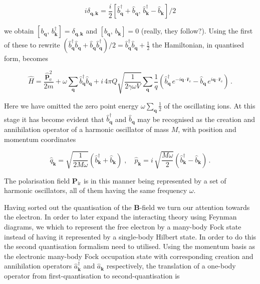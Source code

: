 \documentclass[12pt]{report}
\renewcommand{\vec}[1]{\boldsymbol{\mathbf{#1}}}                        %
\newcommand{\question}[1]{\textcolor{question}{#1}}
\begin{document}
\begin{equation}
	i \delta_{\vec q, \vec k}
	= \frac{i}{2} [\hat b^\dagger_{\vec q} + \hat b_{\vec q}, \, \hat b^\dagger_{\vec k} - \hat b_{\vec k}]/2
\end{equation}

we obtain $ [b_{\vec q}, \, b^\dagger_{\vec k}] = \delta_{\vec q, \vec k} $ and $ [b_{\vec q}, \, b_{\vec k}] = 0 $  \question{(really, they follow?)}. Using the first of these to rewrite $ (\hat b^\dagger_{\vec q} \hat b_{\vec q} + \hat b_{\vec q} \hat b^\dagger_{\vec q})/2  = \hat b^\dagger_{\vec q} \hat b_{\vec q} + \tfrac{1}{2} $ the Hamiltonian, in quantised form, becomes

\begin{equation}
	\hat H = \frac{\hat{\vec p}_\text{e}^2}{2m}
	+ \omega \sum_{\vec q} \hat b^\dagger_{\vec q} \hat b_{\vec q}
	+ i \, 4 \pi Q \sqrt{\frac{1}{2 \gamma \omega V}} \sum_{\vec q} \frac{1}{q} \left( \hat b^\dagger_{\vec q} \, e^{-i \vec q \cdot \hat{\vec r}_\text{e}} - \hat b_{\vec q} \, e^{i \vec q \cdot \hat{\vec r}_\text{e}} \right) \,.
\end{equation}

Here we have omitted the zero point energy $ \omega \sum_{\vec q} \tfrac{1}{2} $ of the oscillating ions. At this stage it has become evident that $ \hat b^\dagger_{\vec q} $ and $ \hat b_{\vec q} $ may be recognised\cite{electronsInLatticeFields} as the creation and annihilation operator of a harmonic oscillator of mass $ M $, with position and momentum coordinates

\begin{equation}
	\hat q_{\vec k} = \sqrt{\frac{1}{2M\omega}} \left( \hat b^\dagger_{\vec k} + \hat b_{\vec k} \right)
	\; , \quad
	\hat p_{\vec k} = i\, \sqrt{\frac{M \omega}{2}} \left( \hat b^\dagger_{\vec k} - \hat b_{\vec k} \right) \,.
\end{equation}

The polarisation field $ \vec P_\text{ir} $ is in this manner being represented by a set of harmonic oscillators, all of them having the same frequency $ \omega $.

Having sorted out the quantisation of the $ \vec B $-field we turn our attention towards the electron. In order to later expand the interacting theory using Feynman diagrams, we which to represent the free electron by a many-body Fock state instead of having it represented by a single-body Hilbert state. In order to do this the second quantisation formalism need to utilised. Using the momentum basis as the electronic many-body Fock occupation state with corresponding creation and annihilation operators $ \hat a^\dagger_{\vec k} $ and $ \hat a_{\vec k} $ respectively, the translation of a one-body operator from first-quantisation to second-quantisation is\cite{quantumTheoryOfManyParticleSystems}
\end{document}
